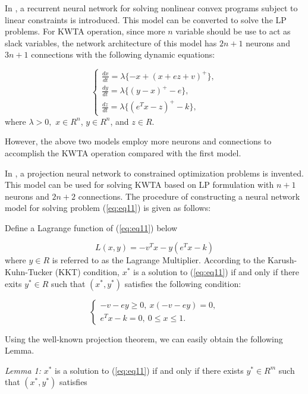 \documentclass[conference]{IEEEtran}
\begin{document}
In \cite{cit:26}, a recurrent neural network for solving nonlinear
convex programs subject to linear constraints is introduced. This
model can be converted to solve the LP problems. For KWTA operation,
since more $n$ variable should be use to act as slack variables, the
network architecture of this model has $2n+1$ neurons and $3n+1$
connections with the following dynamic equations:

\begin{equation}
\left\{\begin{array}{l} \frac{dx}{dt}=\lambda \{-x+(x+ez+v)^{+}\}, \\
\frac{dy}{dt}=\lambda \{(y-x)^{+}-e\}, \\
\frac{dz}{dt}=\lambda\{(e^{T}x-z)^{+}-k\},
\end{array} \right.
\label{eq:KWTA3}
\end{equation}
where $\lambda >0,$ $x\in R^{n}$, $y\in R^{n}$, and $z\in R$.

However, the above two models employ more neurons and connections to
accomplish the KWTA operation compared with the first model.

In \cite{cit:27}, a projection neural network to constrained
optimization problems is invented. This model can be used for
solving KWTA based on LP formulation with $n+1$ neurons and $2n+2$
connections. The procedure of constructing a neural network model
for solving problem (\ref{eq:eq11}) is given as follows:

Define a Lagrange function of (\ref{eq:eq11}) below

\begin{equation}
L(x,y)=-v^{T}x-y(e^{T}x-k)
\end{equation}
where $y\in R$ is referred to as the Lagrange Multiplier. According
to the Karush-Kuhn-Tucker (KKT) condition, $x^{*}$ is a solution to
(\ref{eq:eq11}) if and only if there exits $y^{*}\in R$ such that
$(x^{*},y^{*})$ satisfies the following condition:

\begin{equation}
\left\{\begin{array}{c} -v-ey\ge 0,\
x(-v-ey)=0,\\
e^{T}x-k=0,\ 0\le x\le 1.
\end{array} \right.
\end{equation}

Using the well-known projection theorem, we can easily obtain the
following Lemma.

\textit{Lemma 1:} $x^{*}$ is a solution to (\ref{eq:eq11}) if and
only if there exists $y^{*}\in R^{m}$ such that $(x^{*},y^{*})$
satisfies
\end{document}
